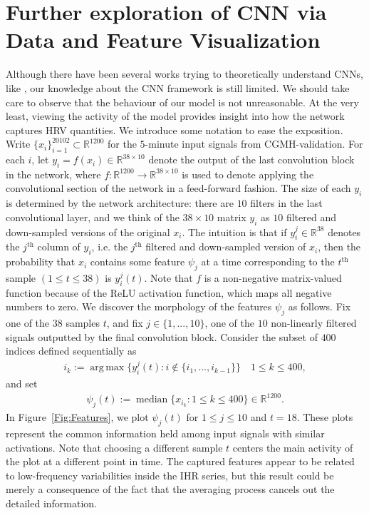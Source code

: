 \documentclass[10pt,a4paper,english]{amsart}
\begin{document}
\section{Further exploration of CNN via Data and Feature Visualization}\label{Sect:Exploration}

Although there have been several works trying to theoretically understand CNNs, like \cite{Mallat2012,LinRolnick2017,Wiatowski2017}, our knowledge about the CNN framework is still limited. We should take care to observe that the behaviour of our model is not unreasonable. At the very least, viewing the activity of the model provides insight into how the network captures HRV quantities. We introduce some notation to ease the exposition. Write $\{x_i\}_{i=1}^{20102} \subset \mathbb{R}^{1200}$ for the $5$-minute input signals from CGMH-validation.  For each $i$, let $y_i = f(x_i) \in \mathbb{R}^{38 \times 10}$ denote the output of the last convolution block in the network, where $f \colon \mathbb{R}^{1200} \rightarrow \mathbb{R}^{38 \times 10}$ is used to denote applying the convolutional section of the network in a feed-forward fashion. The size of each $y_i$ is determined by the network architecture:  there are $10$ filters in the last convolutional layer, and we think of the $38 \times 10$ matrix $y_i$ as $10$ filtered and down-sampled versions of the original $x_i$. The intuition is that if $y_i^j \in \mathbb{R}^{38}$ denotes the $j^\text{th}$ column of $y_i$, i.e. the $j^\text{th}$ filtered and down-sampled version of $x_i$, then the probability that $x_i$ contains some feature $\psi_j$ at a time corresponding to the $t^\text{th}$ sample $(1 \leq t \leq 38)$ is $y_i^j(t)$.  Note that $f$ is a non-negative matrix-valued function because of the ReLU activation function, which maps all negative numbers to zero.  We discover the morphology of the features $\psi_j$ as follows. Fix one of the $38$ samples $t$,
and fix $j \in \{1, ..., 10\}$, one of the $10$ non-linearly filtered signals outputted by the final convolution block. Consider the subset of $400$ indices defined sequentially as
\begin{gather}
i_k := \operatorname*{arg\,max} \{y_i^j(t) : i \notin \{i_1, ..., i_{k-1}\} \} \quad 1 \leq k \leq 400,
\end{gather}
and set
\begin{gather}
\psi_j(t) := \operatorname*{median} \{x_{i_k} : 1 \leq k \leq 400 \} \in \mathbb{R}^{1200}.
\end{gather}
In Figure~\ref{Fig:Features}, we plot $\psi_j(t)$ for $1 \leq j \leq 10$ and $t = 18$. These plots represent the common information held among input signals with similar activations. Note that choosing a different sample $t$ centers the main activity of the plot at a different point in time.
%
The captured features appear to be related to low-frequency variabilities inside the IHR series, but this result could be merely a consequence of the fact that the averaging process cancels out the detailed information.
 
\end{document}
